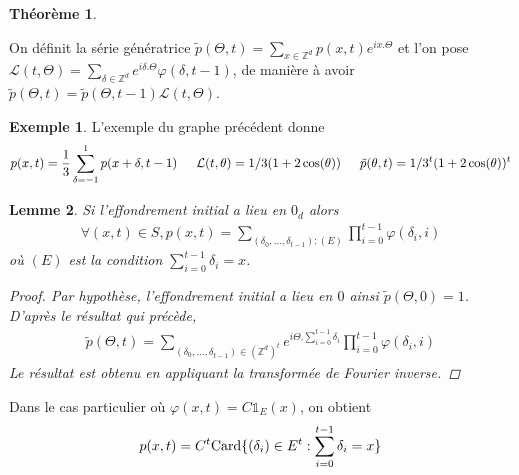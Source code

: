 \documentclass{article}
\newtheorem{theorem}{Théorème}[section]
\newtheorem{lemma}[theorem]{Lemme}
\theoremstyle{definition}
\newtheorem{exmp}{Exemple}[section]
\begin{document}
\begin{theorem}
\end{theorem}
On définit la série génératrice $\tilde{p}(\Theta, t) = \sum_{x\in \mathbb{Z}^d}p(x,t)e^{i x.\Theta}$ et l'on pose  $\mathcal{L}(t,\Theta)= \sum_{\delta\in \mathbb{Z}^d} e^{i\delta.\Theta}\varphi(\delta,t-1)$, de manière à avoir 
$\tilde{p}(\Theta, t) = \tilde{p}(\Theta, t-1)\mathcal{L}(t,\Theta)$.
\begin{exmp}
	L'exemple du graphe précédent donne 
	\begin{align*}
		p(x, t) = \frac{1}{3}\sum_{\delta=-1}^1 p(x+\delta, t-1)\indent \mathcal{L}(t,\theta) = 1/3(1+2\cos(\theta)) \indent \tilde{p}(\theta, t) = 1/3^t(1+2\cos(\theta))^t
	\end{align*}
\end{exmp}
	\begin{lemma}
		Si l'effondrement initial a lieu en $0_{d}$ alors
	\begin{align*}
		\forall (x,t)\in S, p(x,t) = \sum_{(\delta_0, \ldots, \delta_{t-1}) : (E)}  \prod_{i=0}^{t-1}\varphi(\delta_i, i)
	\end{align*}
	où $(E)$ est la condition $\sum_{i=0}^{t-1}\delta_{i} = x$.
	\begin{proof}
		Par hypothèse, l'effondrement initial a lieu en $0$ ainsi $\tilde{p}(\Theta, 0) = 1$. D'après le résultat qui précède, 
		\begin{align*} \tilde{p}(\Theta, t) = %
		\sum_{(\delta_0, \ldots, \delta_{t-1})\in (\mathbb{Z}^d)^{t}} e^{i\Theta.\sum_{i=0}^{t-1} \delta_i} \prod_{i=0}^{t-1}\varphi(\delta_i, i)\end{align*}
			Le résultat est obtenu en appliquant la transformée de Fourier inverse. 
	\end{proof}\end{lemma}
	Dans le cas particulier où $\varphi(x,t)=C\mathds{1}_E(x)$, on obtient 
	\begin{align*}
	p(x,t) = C^t\textup{Card}\{(\delta_i)\in E^t : \sum_{i=0}^{t-1}\delta_i=x\}\end{align*}%
\end{document}
